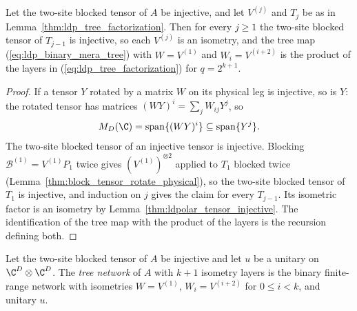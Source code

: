 \begin{lemma}
    \label{lem:ldp_tree_layers_isometries}
    \leanok
    Let the two-site blocked tensor of $A$ be injective, and let $V^{(j)}$ and
    $T_j$ be as in Lemma~\ref{thm:ldp_tree_factorization}. Then for every
    $j\ge1$ the two-site blocked tensor of $T_{j-1}$ is injective, so each
    $V^{(j)}$ is an isometry, and the tree map (\ref{eq:ldp_binary_mera_tree})
    with $W=V^{(1)}$ and $W_i=V^{(i+2)}$ is the product of the layers in
    (\ref{eq:ldp_tree_factorization}) for $q=2^{k+1}$.
\end{lemma}
\begin{proof}
    \leanok
    If a tensor $Y$ rotated by a matrix $W$ on its physical leg is injective,
    so is $Y$: the rotated tensor has matrices $(WY)^i=\sum_jW_{ij}Y^j$, so
    \begin{align*}
        M_D(\C)=\operatorname{span}\{(WY)^i\}
        \subseteq\operatorname{span}\{Y^j\}.
    \end{align*} The two-site blocked tensor of an injective tensor is injective.
    Blocking $\mathcal B^{(1)}=V^{(1)}P_1$ twice gives $(V^{(1)})^{\otimes2}$
    applied to $T_1$ blocked twice
    (Lemma~\ref{thm:block_tensor_rotate_physical}), so the two-site blocked
    tensor of $T_1$ is injective, and induction on $j$ gives the claim for
    every $T_{j-1}$. Its isometric factor is an isometry by
    Lemma~\ref{thm:ldpolar_tensor_injective}. The identification of the
    tree map with the product of the layers is the recursion defining both.
\end{proof}

\begin{definition}
    \label{def:ldp_tree_mera}
    \leanok
    Let the two-site blocked tensor of $A$ be injective and let $u$ be a unitary
    on $\C^D\otimes\C^D$. The \emph{tree network} of $A$ with $k+1$ isometry
    layers is the binary finite-range network with isometries
    $W=V^{(1)}$, $W_i=V^{(i+2)}$ for $0\le i<k$, and unitary $u$.
\end{definition}

